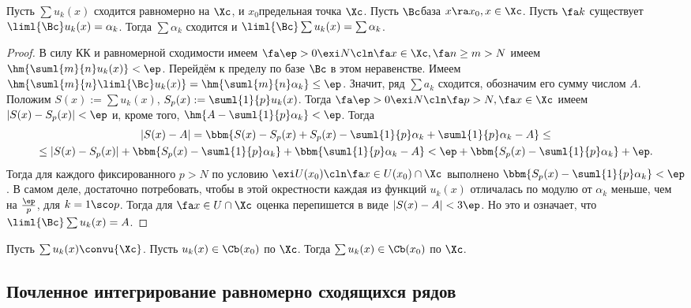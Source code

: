 \documentclass[a4paper]{article}
\begin{document}
\begin{theorem}
Пусть $\sum u_k(x)$ сходится равномерно на $\Xc$, и $x_0$\т предельная точка $\Xc$. Пусть $\Bc$\т база
$x \ra x_0, x \in \Xc$. Пусть $\fa k$ существует $\liml{\Bc} u_k(x) =\alpha_k$. Тогда $\sum \alpha_k$ сходится и $\liml{\Bc}
\sum u_k(x) = \sum \alpha_k$.
\end{theorem}
\begin{proof}
В силу КК и равномерной сходимости имеем $\fa \ep > 0 \exi N\cln \fa x \in \Xc, \fa n \ge m>N$ имеем $\hm{\suml{m}{n}u_k(x)} < \ep$.
Перейдём к пределу по базе $\Bc$ в этом неравенстве. Имеем $\hm{\suml{m}{n}\liml{\Bc}u_k(x)} = \hm{\suml{m}{n} \alpha_k}
\le \ep$. Значит, ряд $\sum a_k$ сходится, обозначим его сумму числом $A$. Положим $S(x) := \sum u_k(x)$, $S_p(x) := \suml{1}{p} u_k(x)$.
Тогда $\fa \ep > 0 \exi N\cln \fa p > N, \fa x \in \Xc$ имеем $|S(x)-S_p(x)|<\ep$ и, кроме того, $\hm{A-\suml{1}{p}\alpha_k} < \ep$.
Тогда
\begin{multline*}
|S(x)-A| = \bbm{S(x)-S_p(x)+S_p(x)-\suml{1}{p}\alpha_k+\suml{1}{p}\alpha_k-A} \le\\
\le|S(x)-S_p(x)|+\bbm{S_p(x)-\suml{1}{p}\alpha_k} +\bbm{\suml{1}{p}\alpha_k-A} <\ep+\bbm{S_p(x)-\suml{1}{p}\alpha_k} +\ep.
\end{multline*}
Тогда для каждого фиксированного $p>N$ по условию $\exi U(x_0)\cln \fa x \in U(x_0) \cap \Xc$ выполнено
$\bbm{S_p(x)-\suml{1}{p}\alpha_k} < \ep$. В самом деле, достаточно потребовать, чтобы в этой окрестности каждая из функций $u_k(x)$ отличалась
по модулю от $\alpha_k$ меньше, чем на $\frac{\ep}{p}$, для $k=1\sco p$. Тогда для $\fa x \in U \cap \Xc$ оценка перепишется в виде $|S(x)-A| < 3\ep$.
Но это и означает, что $\liml{\Bc} \sum u_k(x) = A$.
\end{proof}

\begin{imp}
Пусть $\sum u_k(x)\convu{\Xc}$. Пусть $u_k(x) \in\Cb(x_0)$ по $\Xc$.
Тогда $\sum u_k(x) \in\Cb(x_0)$ по $\Xc$.
\end{imp}

\subsection{Почленное интегрирование равномерно сходящихся рядов}
\end{document}

